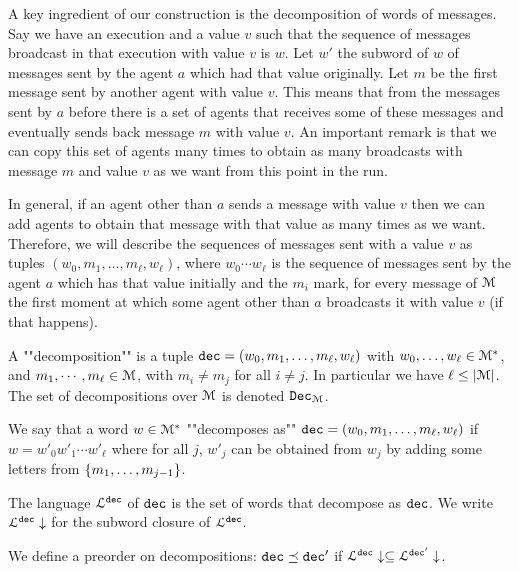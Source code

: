 \begin{definition}
	
	

\end{definition}

A key ingredient of our construction is the decomposition of words of messages. Say we have an execution and a value $v$ such that the sequence of messages broadcast in that execution with value $v$ is $w$. Let $w'$ the subword of $w$ of messages sent by the agent $a$ which had that value originally. Let $m$ be the first message sent by another agent with value $v$. This means that from the messages sent by $a$ before there is a set of agents that receives some of these messages and eventually sends back message $m$ with value $v$. An important remark is that we can copy this set of agents many times to obtain as many broadcasts with message $m$ and value $v$ as we want from this point in the run.

In general, if an agent other than $a$ sends a message with value $v$ then we can add agents to obtain that message with that value as many times as we want.
Therefore, we will describe the sequences of messages sent with a value $v$ as tuples $(w_0, m_1, \ldots, m_\ell, w_\ell)$, where $w_0 \cdots w_\ell$ is the sequence of messages sent by the agent $a$ which has that value initially and the $m_i$ mark, for every message of $\mathcal{M}$ the first moment at which some agent other than $a$ broadcasts it with value $v$ (if that happens).

\begin{definition}
	A ""decomposition"" is a tuple $\mathtt{dec} = (w_0, m_1, \ldots, m_\ell, w_\ell)$ with $w_0, \ldots, w_\ell \in \mathcal{M}^*$, and $m_1, \cdots, m_\ell \in \mathcal{M}$, with $m_i \neq m_j$ for all $i\neq j$. In particular we have $\ell \leq |\mathcal{M}|$. The set of decompositions over $\mathcal{M}$ is denoted $\mathtt{Dec}_{\mathcal{M}}$.
	
	We say that a word $w \in \mathcal{M}^*$ ""decomposes as"" $\mathtt{dec} = (w_0, m_1, \ldots, m_\ell, w_\ell)$ if $w = w'_0 w'_1 \cdots w'_\ell$ where for all $j$, $w'_j$ can be obtained from $w_j$ by adding some letters from $\{m_1, \ldots, m_{j-1}\}$.
	
	The language $\mathcal{L}^{\mathtt{\mathtt{dec}}}$ of $\mathtt{dec}$ is the set of words that decompose as $\mathtt{dec}$. We write $\mathcal{L}^{\mathtt{\mathtt{dec}}}\downarrow$ for the subword closure of $\mathcal{L}^{\mathtt{\mathtt{dec}}}$.
	
	We define a preorder on decompositions:
	$\mathtt{dec} \preceq \mathtt{dec}'$ if $\mathcal{L}^{\mathtt{\mathtt{dec}}}\downarrow \subseteq \mathcal{L}^{\mathtt{\mathtt{dec}'}}\downarrow$.
\end{definition}


